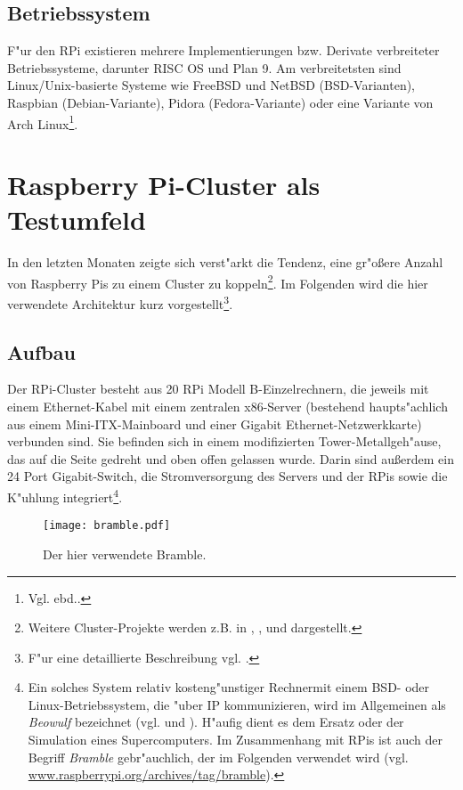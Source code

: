 \subsection{Betriebssystem}\label{RPi OS}

F"ur den RPi existieren mehrere Implementierungen bzw. Derivate verbreiteter Betriebssysteme, darunter RISC OS und Plan 9. Am verbreitetsten sind Linux/Unix-basierte Systeme wie FreeBSD und NetBSD (BSD-Varianten), Raspbian (Debian-Variante), Pidora (Fedora-Variante) oder eine Variante von Arch Linux\footnote{Vgl. ebd..}.   

\section{Raspberry Pi-Cluster als Testumfeld}\label{Spezifikation Bramble}

In den letzten Monaten zeigte sich verst"arkt die Tendenz, eine gr"o\ss ere Anzahl von Raspberry Pis zu einem Cluster zu koppeln\footnote{Weitere Cluster-Projekte werden z.B. in \cite{cox13}, \cite{kie01}, \cite{bal12} und \cite{ou13} dargestellt.}. Im Folgenden wird die hier verwendete Architektur kurz vorgestellt\footnote{F"ur eine detaillierte Beschreibung vgl. \cite{kli13}.}. 

\subsection{Aufbau}\label{Bramble Hardware}
Der RPi-Cluster besteht aus 20 RPi Modell B-Einzelrechnern, die jeweils mit einem Ethernet-Kabel mit einem zentralen x86-Server (bestehend haupts"achlich aus einem Mini-ITX-Mainboard und einer Gigabit Ethernet-Netzwerkkarte) verbunden sind. Sie befinden sich in einem modifizierten Tower-Metallgeh"ause, das auf die Seite gedreht und oben offen gelassen wurde. Darin sind au\ss erdem ein 24 Port Gigabit-Switch, die Stromversorgung des Servers und der RPis sowie die K"uhlung integriert\footnote{Ein solches System relativ kosteng"unstiger Rechnermit einem BSD- oder Linux-Betriebssystem, die "uber IP kommunizieren, wird im Allgemeinen als \textit{Beowulf} bezeichnet (vgl. \cite{kie01} und \cite{kli13}). H"aufig dient es dem Ersatz oder der Simulation eines Supercomputers. Im Zusammenhang mit RPis ist auch der Begriff \textit{Bramble} gebr"auchlich, der im Folgenden verwendet wird (vgl. \url{www.raspberrypi.org/archives/tag/bramble}).}. 
\begin{figure}[htb]
	\centering
	\texttt{[image: bramble.pdf]}\\ 
	\caption{Der hier verwendete Bramble.}\label{fig:Bramble}
\end{figure}

